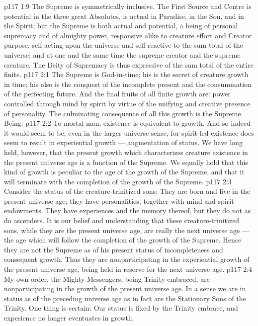\vs p117 1:9 The Supreme is symmetrically inclusive. The First Source and Centre is potential in the three great Absolutes, is actual in Paradise, in the Son, and in the Spirit; but the Supreme is both actual and potential, a being of personal supremacy and of almighty power, responsive alike to creature effort and Creator purpose; self\hyp{}acting upon the universe and self\hyp{}reactive to the sum total of the universe; and at one and the same time the supreme creator and the supreme creature. The Deity of Supremacy is thus expressive of the sum total of the entire finite.
\vs p117 2:1 The Supreme is God\hyp{}in\hyp{}time; his is the secret of creature growth in time; his also is the conquest of the incomplete present and the consummation of the perfecting future. And the final fruits of all finite growth are: power controlled through mind by spirit by virtue of the unifying and creative presence of personality. The culminating consequence of all this growth is the Supreme Being.
\vs p117 2:2 To mortal man, existence is equivalent to growth. And so indeed it would seem to be, even in the larger universe sense, for spirit\hyp{}led existence does seem to result in experiential growth --- augmentation of status. We have long held, however, that the present growth which characterizes creature existence in the present universe age is a function of the Supreme. We equally hold that this kind of growth is peculiar to the age of the growth of the Supreme, and that it will terminate with the completion of the growth of the Supreme.
\vs p117 2:3 \pc Consider the status of the creature\hyp{}trinitized sons: They are born and live in the present universe age; they have personalities, together with mind and spirit endowments. They have experiences and the memory thereof, but they do not  as do ascenders. It is our belief and understanding that these creature\hyp{}trinitized sons, while they are  the present universe age, are really  the next universe age --- the age which will follow the completion of the growth of the Supreme. Hence they are not  the Supreme as of his present status of incompleteness and consequent growth. Thus they are nonparticipating in the experiential growth of the present universe age, being held in reserve for the next universe age.
\vs p117 2:4 My own order, the Mighty Messengers, being Trinity embraced, are nonparticipating in the growth of the present universe age. In a sense we are in status as of the preceding universe age as in fact are the Stationary Sons of the Trinity. One thing is certain: Our status is fixed by the Trinity embrace, and experience no longer eventuates in growth.

